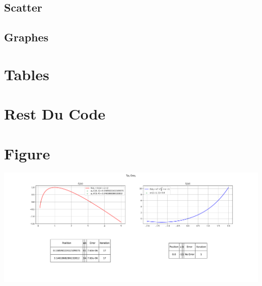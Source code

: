 \subsection{Scatter}


\vspace{0.5cm}

\subsection{Graphes}


\vspace{1cm}
\section{Tables}


\newpage
\section{Rest Du Code}


\vspace{1.5cm}
\section{Figure}
\begin{center}
    \includegraphics[height=0.35\textheight]{Exercices/EX2/fig.pdf}
\end{center}


